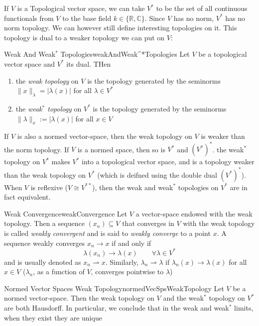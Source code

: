 \documentclass[oneside]{book}
\newcommand{\R}{\mathbb{R}}
\newcommand{\C}{\mathbb{C}}
\newcommand{\sse}{\subseteq}
\newcommand{\wto}{\rightharpoonup}
\begin{document}
If $V$ is a Topological vector space, we can take $V^*$ to be the set of all continuous functionals from $V$ to the
base field $k \in \{\R, \C\}$. Since $V$ has no norm, $V^*$ has no norm topology. We can however still define
interesting topologies on it. This topology is dual to a weaker topology we can put on $V$:

\begin{defn}{Weak And Weak$^*$ Topologies}{weakAndWeak^*Topologies}
	Let $V$ be a topological vector space and $V^*$ its dual. THen
	\begin{enumerate}
		\item the \emph{weak topology} on $V$ is the topology generated by the seminorms $\|x\|_\lambda
			= |\lambda(x)|$ for all $\lambda \in V^*$
		\item the \emph{weak$^*$ topology} on $V^*$ is the topology generated by the seminorms
			$\|\lambda\|_x := |\lambda(x)|$ for all $x \in V$
	\end{enumerate}
\end{defn}

If $V$ is also a normed vector-space, then the weak topology on $V$ is weaker than the norm topology. If $V$ is a normed
space, then so is $V^*$ and $(V^*)^*$. the weak$^*$ topology on $V^*$ makes $V^*$ into a topological vector space, and
is a topology weaker than the weak topology on $V^*$ (which is deifned using the double dual $(V^*)^*$). When $V$ is
reflexive ($V\cong V^{**}$), then the weak and weak$^*$ topologies on $V^*$ are in fact equivalent.

\begin{defn}{Weak Convergence}{weakConvergence}
	Let $V$ a vector-space endowed with the weak topology. Then a sequence $(x_n) \sse V$ that converges in $V$
	with the weak topology is called \emph{weakly convergent} and is said to \emph{weakly converge} to a point
	$x$. A sequence weakly converges $x_n \to x$ if and only if
	\[
		\lambda(x_n) \to \lambda(x) \qquad \forall \lambda \in V^*
	\]
	and is usually denoted as $x_n \rightharpoonup x$. Similarly, $\lambda_n \wto \lambda$ if
	$\lambda_n(x) \to \lambda(x)$ for all $x \in V$ ($\lambda_n$, as a function of $V$, converges pointwise to
	$\lambda$)
\end{defn}

\begin{prop}{Normed Vector Spaces Weak Topology}{normedVecSpsWeakTopology}
	Let $V$ be a normed vector-space. Then the weak topology on $V$ and the weak$^*$ topology on $V^*$ are both
	Hausdorff. In particular, we conclude that in the weak and weak$^*$ limits, when they exist they are unique
\end{prop}
\end{document}
